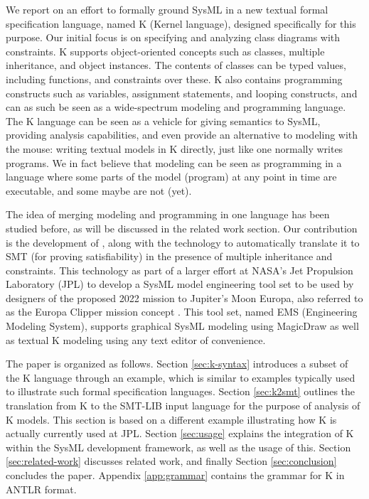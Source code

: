 We report on an effort to formally ground SysML in a new textual
formal specification language, named K (Kernel language), designed
specifically for this purpose.  
Our initial focus is on specifying and analyzing class diagrams
with constraints. K supports object-oriented concepts
such as classes, multiple inheritance, and object instances. The
contents of classes can be typed values, including functions, and
constraints over these. K also contains programming constructs such as
variables, assignment statements, and looping constructs, and can as
such be seen as a wide-spectrum modeling and programming language.
The K language can be seen as a vehicle for giving semantics to SysML,
providing analysis capabilities, and even provide an alternative to
modeling with the mouse: writing textual models in K directly, just
like one normally writes programs.  We in fact believe that modeling
can be seen as programming in a language where some parts of the
model (program) at any point in time are executable, and some maybe
are not (yet).

The idea of merging modeling and programming in one language has been
studied before, as will be discussed in the related work section. Our
contribution is the development of \Klang{}, along with the technology
to automatically translate it to SMT (for proving satisfiability) in
the presence of multiple inheritance and constraints. This technology
as part of a larger effort at NASA's Jet Propulsion Laboratory (JPL)
to develop a SysML model engineering tool set to be used by designers
of the proposed 2022 mission to Jupiter's Moon Europa, also referred to
as the Europa Clipper mission concept \cite{europa-clipper}. This tool set,
named EMS (Engineering Modeling System), supports graphical SysML
modeling using MagicDraw \cite{magicdraw} as well as textual K
modeling using any text editor of convenience. 

The paper is organized as follows. Section \ref{sec:k-syntax}
introduces a subset of the K language through an example, which is
similar to examples typically used to illustrate such formal
specification languages. Section \ref{sec:k2smt} outlines the
translation from K to the SMT-LIB input language for the purpose of
analysis of K models. This section is based on a different example
illustrating how K is actually currently used at JPL. Section
\ref{sec:usage} explains the integration of K within the SysML
development framework, as well as the usage of this. Section
\ref{sec:related-work} discusses related work, and finally Section
\ref{sec:conclusion} concludes the paper. Appendix \ref{app:grammar}
contains the grammar for K in ANTLR \cite{antlr} format.

